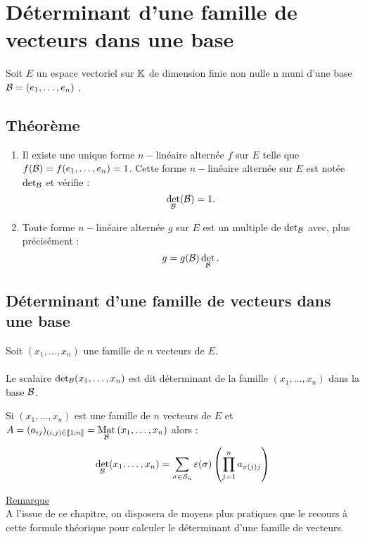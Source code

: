 \section{Déterminant d’une famille de vecteurs dans une base}
    Soit \(E\) un espace vectoriel sur \(\K\) de dimension finie non nulle n muni d’une base \(\cal{B} = (e_1, \dots  , e_n)\) .
\subsection{Théorème}
\begin{theo}
    \begin{enumerate}
        \item Il existe une unique forme \(n-\)linéaire  alternée \(f\) sur \(E\) telle que \(f (\cal{B}) = f (e_1, \dots  , e_n) = 1\).
            Cette forme \(n-\)linéaire  alternée sur \(E\) est notée \(\det_{\cal{B}}\) et vérifie :
                \[\det_{\cal{B}}(\cal{B}) = 1.\]
        \item Toute forme \(n-\)linéaire  alternée \(g\) sur \(E\) est un multiple de \(\det_{\cal{B}}\) avec, plus précisément :
            \[g = g (\cal{B}) \det_{\cal{B}}.\]
    \end{enumerate}
\end{theo}
\subsection{Déterminant d’une famille de vecteurs dans une base}
\begin{defi}
    Soit \((x_1, \dots  , x_n)\) une famille de \(n\) vecteurs de \(E\).\\~\\
    Le scalaire \(\det_{\cal{B}} (x_1, \dots  , x_n)\) est dit déterminant de la famille \((x_1, \dots  , x_n)\) dans la base \(\cal{B}\).
\end{defi}
\begin{defprop}
    Si \((x_1, \dots  , x_n)\) est une famille de \(n\) vecteurs de \(E\) et \(A = (a_{ij} )_{(i,j)\in \interventierii{1}{n}} = \Mat{\cal{B}}{x_1, \dots  , x_n}\) alors :
    \[\det_{\cal{B}}(x_1, \dots  , x_n) = \sum_{\sigma \in \cal{S}_n} \epsilon (\sigma ) \paren{\prod^{n}_{j=1} a_{\sigma (j)j}}\]

    \underline{Remarque}\\
    A l’issue de ce chapitre, on disposera de moyens plus pratiques que le recours à cette formule théorique pour calculer le déterminant d’une famille de vecteurs.
\end{defprop}

